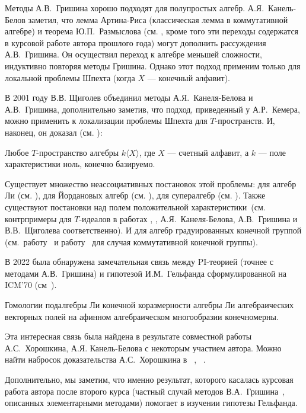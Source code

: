 Методы А.В.\ Гришина хорошо подходят для полупростых алгебр.
А.Я.\ Канель-Белов заметил, что лемма Артина-Риса (классическая лемма в коммутативной алгебре) и теорема Ю.П.\ Размыслова (см. \cite{GrishinSchigolev}, кроме того эти переходы содержатся в курсовой работе автора прошлого года) могут дополнить рассуждения А.В.\ Гришина.
Он осуществил переход к алгебре меньшей сложности, индуктивно повторяя методы Гришина.
Однако этот подход применим только для локальной проблемы Шпехта (когда $X$ — конечный алфавит).

В 2001 году В.В. Щиголев объединил методы А.Я.\ Канеля-Белова и А.В.\ Гришина, дополнительно заметив, что подход, приведенный у А.Р.\ Кемера, можно применить к локализации проблемы Шпехта для $T$-пространств.
И, наконец, он доказал (см. \cite{Shchigolev}):
\vskip 0.1in\noindent
\begin{theorem*} [В.В. Щиголев, 2001]
    Любое $T$-пространство алгебры $k\langle X\rangle$, где $X$ — счетный алфавит, а $k$ — поле характеристики ноль, конечно базируемо.
\end{theorem*}
\vskip 0.1in\noindent

Существует множество неассоциативных постановок этой проблемы: для алгебр Ли (см. \cite{Lie}), для Йордановых алгебр (см. \cite{Jordan}), для супералгебр (см. \cite{Super}).
Также существуют постановки над полем положительной характеристики\ (см. контрпримеры для $T$-идеалов в работах \cite{ConterKanel}, \cite{ConterGrishin}, \cite{ConterShchigolev} А.Я.\ Канеля-Белова, А.В.\ Гришина и В.В.\ Щиголева соответственно).
И для алгебр градуированных конечной группой (см.\ работу~\cite{GradedKanel} и работу~\cite{GradedSviridova} для случая коммутативной конечной группы).

В 2022 была обнаружена замечательная связь между PI-теорией (точнее с методами А.В.\ Гришина) и гипотезой И.М.\ Гельфанда сформулированной на ICM’70 (см\ \cite{Gelfand}).
\vskip 0.1in\noindent
\begin{conjecture}[И.М.\ Гельфанд, 1970]
    \label{Gelfand}
    Гомологии подалгебры Ли конечной коразмерности алгебры Ли алгебраических векторных полей на афинном алгебраическом многообразии конечномерны.
\end{conjecture}
\vskip 0.1in\noindent
Эта интересная связь была найдена в результате совместной работы А.С.\ Хорошкина, А.Я. Канель-Белова с некоторым участием автора.
Можно найти набросок доказательства А.С.\ Хорошкина в ~\cite{Feigin-Kanel-Khoroshkin}, ~\cite{Centrone-Kanel-Khoroshkin-Vorobiov}.

Дополнительно, мы заметим, что именно результат, которого касалась курсовая работа автора после второго курса (частный случай методов В.А.\ Гришина~\cite{Grishin}, описанных элементарными методами) помогает в изучении гипотезы Гельфанда.